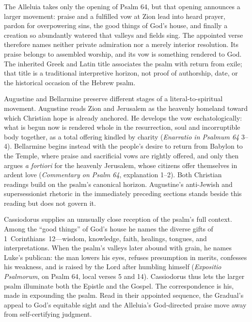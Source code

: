 The Alleluia takes only the opening of Psalm 64, but that opening announces a
larger movement: praise and a fulfilled vow at Zion lead into heard prayer,
pardon for overpowering sins, the good things of God's house, and finally a
creation so abundantly watered that valleys and fields sing. The appointed
verse therefore names neither private admiration nor a merely interior
resolution. Its praise belongs to assembled worship, and its vow is something
rendered to God. The inherited Greek and Latin title associates the psalm with
return from exile; that title is a traditional interpretive horizon, not proof
of authorship, date, or the historical occasion of the Hebrew psalm.

Augustine and Bellarmine preserve different stages of a literal-to-spiritual
movement. Augustine reads Zion and Jerusalem as the heavenly homeland toward
which Christian hope is already anchored. He develops the vow
eschatologically: what is begun now is rendered whole in the resurrection,
soul and incorruptible body together, as a total offering kindled by charity
(\emph{Enarratio in Psalmum 64} 3--4). Bellarmine begins instead with the
people's desire to return from Babylon to the Temple, where praise and
sacrificial vows are rightly offered, and only then argues \emph{a fortiori}
for the heavenly Jerusalem, whose citizens offer themselves in ardent love
(\emph{Commentary on Psalm 64}, explanation 1--2). Both Christian readings
build on the psalm's canonical horizon. Augustine's anti-Jewish and
supersessionist rhetoric in the immediately preceding sections stands beside
this reading but does not govern it.

Cassiodorus supplies an unusually close reception of the psalm's full context.
Among the ``good things'' of God's house he names the diverse gifts of
1~Corinthians~12---wisdom, knowledge, faith, healings, tongues, and
interpretations. When the psalm's valleys later abound with grain, he names
Luke's publican: the man lowers his eyes, refuses presumption in merits,
confesses his weakness, and is raised by the Lord after humbling himself
(\emph{Expositio Psalmorum}, on Psalm 64, local verses 5 and 14). Cassiodorus
thus lets the larger psalm illuminate both the Epistle and the Gospel. The
correspondence is his, made in expounding the psalm. Read in their appointed
sequence, the Gradual's appeal to God's equitable sight and the Alleluia's
God-directed praise move away from self-certifying judgment.
